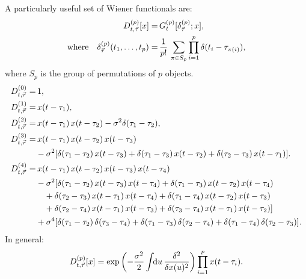 \documentclass[12pt]{article}
\theoremstyle{slplain}
\theoremstyle{sldefinition}
\theoremstyle{remark}
\begin{document}
A particularly useful set of Wiener functionals are:
%
\begin{equation}\label{eq:wienerdelta}
  \begin{aligned}
    D^{(p)}_{t,\vec{\tau}}[x] =& \, G^{(p)}_t[\delta^{(p)}_{\vec{\tau}};x], \\ \text{where}\quad
    \delta^{(p)}_{\vec{\tau}}(t_1,\ldots,t_p) =& \, \frac{1}{p!}\,\sum_{\pi\in S_p} \prod_{i=1}^p \delta(t_i-\tau_{\pi(i)}),
  \end{aligned}
\end{equation}
%
where $S_p$ is the group of permutations of $p$ objects.
\eg
%
\begin{equation}\label{eq:wienerdeltaex}
  \begin{aligned}
    D^{(0)}_{t,\vec{\tau}} =&\, 1, \\
    D^{(1)}_{t,\vec{\tau}} =&\, x(t-\tau_1), \\
    D^{(2)}_{t,\vec{\tau}} =&\, x(t-\tau_1)\,x(t-\tau_2) - \sigma^2\delta(\tau_1-\tau_2), \\
    D^{(3)}_{t,\vec{\tau}} =&\, x(t-\tau_1)\,x(t-\tau_2)\,x(t-\tau_3) \\& - \sigma^2 [\delta(\tau_1-\tau_2)\,x(t-\tau_3) + \delta(\tau_1-\tau_3)\,x(t-\tau_2) + \delta(\tau_2-\tau_3)\,x(t-\tau_1) ]. \\
    D^{(4)}_{t,\vec{\tau}} =&\, x(t-\tau_1)\,x(t-\tau_2)\,x(t-\tau_3)\,x(t-\tau_4) \\& - \sigma^2 [\delta(\tau_1-\tau_2)\,x(t-\tau_3)\,x(t-\tau_4) + \delta(\tau_1-\tau_3)\,x(t-\tau_2)\,x(t-\tau_4) \\&\quad + \delta(\tau_2-\tau_3)\,x(t-\tau_1)\,x(t-\tau_4) + \delta(\tau_1-\tau_4)\,x(t-\tau_2)\,x(t-\tau_3) \\&\quad + \delta(\tau_2-\tau_4)\,x(t-\tau_1)\,x(t-\tau_3) +     \delta(\tau_3-\tau_4)\,x(t-\tau_1)\,x(t-\tau_2) ] \\& + \sigma^4 [ \delta(\tau_1-\tau_2)\,\delta(\tau_3-\tau_4) + \delta(\tau_1-\tau_3)\,\delta(\tau_2-\tau_4) + \delta(\tau_1-\tau_4)\,\delta(\tau_2-\tau_3) ].
  \end{aligned}
\end{equation}
%
In general:
%
\begin{equation}\label{eq:wienerdeltagen}
  D\rp{p}_{t,\vec{\tau}}[x] = \exp\prn{-\frac{\sigma^2}{2}\intd{u}\fdf{^2}{x(u)^2}} \prod_{i=1}^p x(t-\tau_i).
\end{equation}
%
\end{document}
